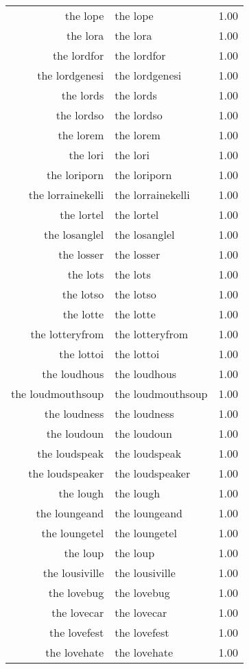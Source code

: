 \begin{table}[ht]
\begin{tabular}{rlr}
  the lope & the lope & 1.00 \\ 
  the lora & the lora & 1.00 \\ 
  the lordfor & the lordfor & 1.00 \\ 
  the lordgenesi & the lordgenesi & 1.00 \\ 
  the lords & the lords & 1.00 \\ 
  the lordso & the lordso & 1.00 \\ 
  the lorem & the lorem & 1.00 \\ 
  the lori & the lori & 1.00 \\ 
  the loriporn & the loriporn & 1.00 \\ 
  the lorrainekelli & the lorrainekelli & 1.00 \\ 
  the lortel & the lortel & 1.00 \\ 
  the losanglel & the losanglel & 1.00 \\ 
  the losser & the losser & 1.00 \\ 
  the lots & the lots & 1.00 \\ 
  the lotso & the lotso & 1.00 \\ 
  the lotte & the lotte & 1.00 \\ 
  the lotteryfrom & the lotteryfrom & 1.00 \\ 
  the lottoi & the lottoi & 1.00 \\ 
  the loudhous & the loudhous & 1.00 \\ 
  the loudmouthsoup & the loudmouthsoup & 1.00 \\ 
  the loudness & the loudness & 1.00 \\ 
  the loudoun & the loudoun & 1.00 \\ 
  the loudspeak & the loudspeak & 1.00 \\ 
  the loudspeaker & the loudspeaker & 1.00 \\ 
  the lough & the lough & 1.00 \\ 
  the loungeand & the loungeand & 1.00 \\ 
  the loungetel & the loungetel & 1.00 \\ 
  the loup & the loup & 1.00 \\ 
  the lousiville & the lousiville & 1.00 \\ 
  the lovebug & the lovebug & 1.00 \\ 
  the lovecar & the lovecar & 1.00 \\ 
  the lovefest & the lovefest & 1.00 \\ 
  the lovehate & the lovehate & 1.00 \\ 

\end{tabular}
\end{table}

